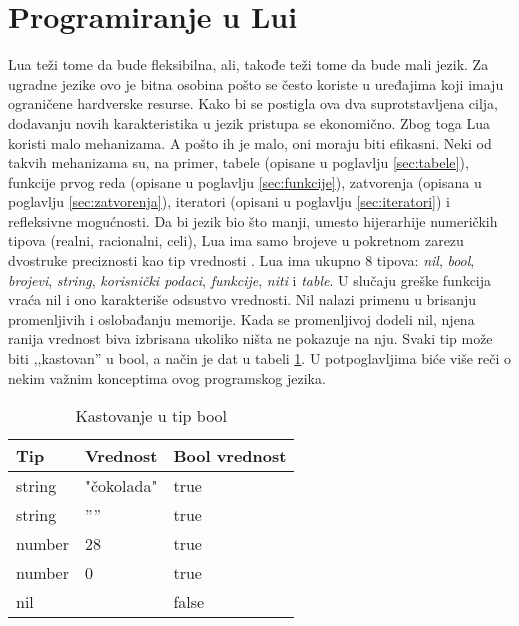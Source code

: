 \documentclass[a4paper]{article}
\begin{document}
\section{Programiranje u Lui}
\label{sec:programiranje}


Lua teži tome da bude fleksibilna, ali, takođe teži tome da bude mali jezik. Za ugradne jezike ovo je bitna osobina pošto se često koriste u uređajima koji imaju ograničene hardverske resurse. Kako bi se postigla ova dva suprotstavljena cilja, dodavanju novih karakteristika u jezik pristupa se ekonomično. Zbog toga Lua koristi malo mehanizama. A pošto ih je malo, oni moraju biti efikasni. Neki od takvih mehanizama su, na primer, tabele (opisane u poglavlju \ref{sec:tabele}), funkcije prvog reda (opisane u poglavlju \ref{sec:funkcije}), zatvorenja (opisana u poglavlju \ref{sec:zatvorenja}), iteratori (opisani u poglavlju \ref{sec:iteratori}) i refleksivne mogućnosti. Da bi jezik bio što manji, umesto hijerarhije numeričkih tipova (realni, racionalni, celi), Lua ima samo brojeve u pokretnom zarezu dvostruke preciznosti kao tip vrednosti \cite{multiParadigms}.
Lua ima ukupno 8 tipova: \textit{nil}, \textit{bool}, \textit{brojevi}, \textit{string}, \textit{korisnički podaci}, \textit{funkcije}, \textit{niti} i \textit{table}. U slučaju greške funkcija vraća nil i ono karakteriše odsustvo vrednosti. Nil nalazi primenu u brisanju promenljivih i oslobađanju memorije. Kada se promenljivoj dodeli nil, njena ranija vrednost biva izbrisana ukoliko ništa ne pokazuje na nju. Svaki tip može biti ,,kastovan'' u bool, a način je dat u tabeli \ref{kastovanje}. U potpoglavljima biće više reči o nekim važnim konceptima ovog programskog jezika.

\begin{table}[h!]
\begin{center}
\begin{tabular}{|l|l|l|}
\hline
Tip & Vrednost & Bool vrednost \\
\hline
string &  "čokolada" &  true \\
\hline
string  & '''' &  true \\
\hline
number &  28 &  true \\
\hline
number & 0 &  true \\
\hline
nil &   & false \\
\hline 
\end{tabular}
\caption{Kastovanje u tip bool}
\label{kastovanje}
\end{center}
\end{table}
\end{document}
